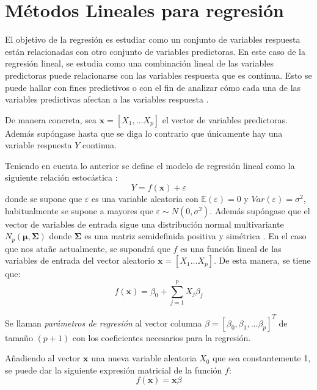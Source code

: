 \section{Métodos Lineales para regresión}

\noindent El objetivo de la regresión es estudiar como un conjunto de variables respuesta están relacionadas con otro conjunto de variables predictoras. En este caso de la regresión lineal, se estudia como una combinación lineal de las variables predictoras puede relacionarse con las variables respuesta que es continua. Esto se puede hallar con fines predictivos o con el fin de analizar cómo cada una de las variables predictivas afectan a las variables respuesta \cite{Johnson 2007}. 

\noindent De manera concreta, sea $\mathbf{x}=[X_1,\ldots X_p]$ el vector de variables predictoras. Además supóngase hasta que se diga lo contrario que únicamente hay una variable respuesta $Y$ continua. 

\noindent Teniendo en cuenta lo anterior se define el modelo de regresión lineal como la siguiente relación estocástica \cite{Hastie 2001, Johnson 2007}:
\begin{equation}
Y=f(\textbf{x})+\varepsilon
\end{equation}
\noindent donde se supone que  $\varepsilon$ es una variable aleatoria con $\mathbb{E}(\varepsilon)=0$ y $Var(\varepsilon)=\sigma^2$, habitualmente se supone a mayores que  $\varepsilon \sim N(0,\sigma^2)$. Además supóngase que el vector de variables de entrada sigue una distribución normal multivariante $N_p(\mathbf{\mu},\mathbf{\Sigma})$ donde $\mathbf{\Sigma }$ es una matriz semidefinida positiva y simétrica \cite{Chatfield 1989}. 
\newpage
\noindent En el caso que nos atañe actualmente, se supondrá que $f$ es una función lineal de las variables de entrada del vector aleatorio $\textbf{x}=[X_1\ldots X_p]$. De esta manera, se tiene que:  
\begin{equation}
f(\textbf{x})=\beta_0+\sum_{j=1}^p X_j\beta_j
\end{equation}

\begin{defi}
Se llaman \emph{parámetros de regresión} al vector columna $\beta=[\beta_0, \beta_1, \ldots \beta_p]^T$ de tamaño $(p+1)$ con los coeficientes necesarios para la regresión. 
\end{defi} 

\noindent Añadiendo al vector $\mathbf{x}$ una nueva variable aleatoria $X_0$ que sea constantemente 1, se puede dar la siguiente expresión matricial de la función $f$:
\begin{equation}
f(\mathbf{x})= \mathbf{x}\beta
\end{equation}

